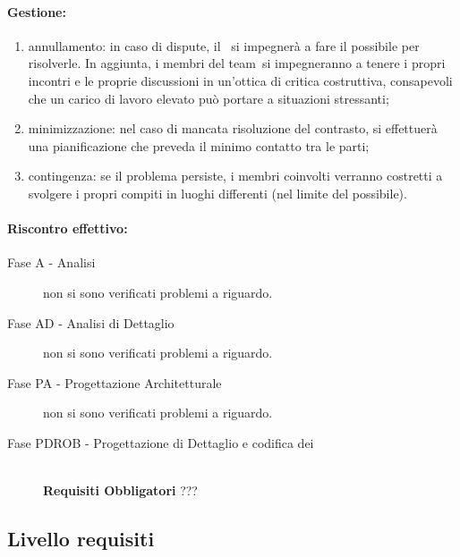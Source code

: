 \documentclass[../PianoProgetto.tex]{subfiles}
\begin{document}
	\paragraph*{Gestione:}
	\begin{enumerate}
		\item annullamento: in caso di dispute, il \responsabilediprogetto\ si impegnerà a fare il possibile per risolverle. In aggiunta, i membri del team\g\ si impegneranno a tenere i propri incontri e le proprie discussioni in un'ottica di critica costruttiva, consapevoli che un carico di lavoro elevato può portare a situazioni stressanti;
		\item minimizzazione: nel caso di mancata risoluzione del contrasto, si effettuerà una pianificazione che preveda il minimo contatto tra le parti; 
		\item contingenza: se il problema persiste, i membri coinvolti verranno costretti a svolgere i propri compiti in luoghi differenti (nel limite del possibile).
	\end{enumerate}	
	
	
	\paragraph*{Riscontro effettivo:}
		\begin{description}
			\item[Fase A - Analisi] non si sono verificati problemi a riguardo.
			\item[Fase AD - Analisi di Dettaglio] non si sono verificati problemi a riguardo.
			\item[Fase PA - Progettazione Architetturale] non si sono verificati problemi a riguardo.
			\item[Fase PDROB - Progettazione di Dettaglio e codifica dei]  \ \\
					\textbf{Requisiti Obbligatori} ???
		\end{description}

\newpage
\subsection{Livello requisiti}
\end{document}
